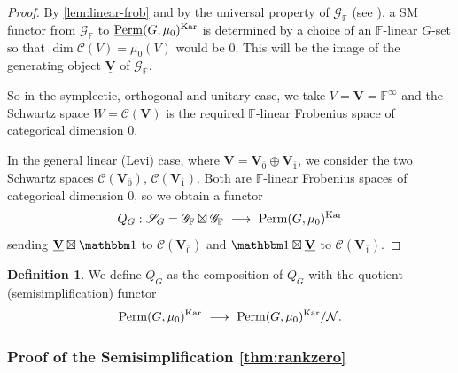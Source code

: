 \documentclass[11pt,a4paper]{amsart}
\theoremstyle{plain}%
\theoremstyle{definition}
\newtheorem{definition}[lemma]{Definition}
\theoremstyle{remark}
\newcommand{\triv}{{\mathbbm 1}}
\newcommand{\V}{\mathbf{V}}
\newcommand{\Perm}{\underline{{\rm Perm}}}
\newcommand{\F}{{\mathbb F}}
\newcommand{\Kar}{\mathrm{Kar}}
\newcommand{\N}{\mathcal N}
\newcommand{\cC}{\mathcal{C}}
\begin{document}
\begin{proof}
By \cref{lem:linear-frob} and by the universal property of $\mathscr G_{\F}$ (see \cite[Theorem~8.1.1]{EAHGL}), a SM functor from $\mathscr G_{\F}$ to $\Perm(G, \mu_0)^{\Kar}$ is determined by a choice of an $\F$-linear $G$-set so that $\dim \cC(V)=\mu_0(V)$ would be $0$. This will be the image of the generating object $\underline{\V}$ of $ \mathscr G_{\F}$.

So in the symplectic, orthogonal and unitary case, we take $V=\V=\F^{\infty}$ and the Schwartz space $W=\cC(\mathbf V)$ is the required $\F$-linear Frobenius space of categorical dimension $0$. 

In the general linear (Levi) case, where $\mathbf V=\mathbf V_{\bar0}\oplus\mathbf V_{\bar1}$, we consider the two Schwartz spaces $\cC(\mathbf V_{\bar0})$, $\cC(\mathbf V_{\bar1})$. Both are $\F$-linear Frobenius spaces of categorical dimension $0$, so we obtain a functor 
\[
 Q_G: \mathscr S_G = \mathscr G_{\F}\boxtimes \mathscr G_{\F}~\longrightarrow~\mathcal \Perm(G, \mu_0)^{\Kar}
\] 
sending $\underline{\V}\boxtimes \triv $ to $\cC(\mathbf V_{\bar0})$ and $ \triv \boxtimes \underline{\V}$ to $\cC(\mathbf V_{\bar1})$.
\end{proof}
\begin{definition}\label{def:overline_Q_G}
    We define $\overline{Q}_G$ as the composition of $Q_G$ with the quotient (semisimplification) functor 
$$\Perm(G, \mu_0)^{\Kar} ~\longrightarrow~\Perm(G, \mu_0)^{\Kar}/\N.$$
\end{definition}









\subsubsection{Proof of the Semisimplification \cref{thm:rankzero}}\label{sssec:proof_of_semisimplification}
\end{document}
